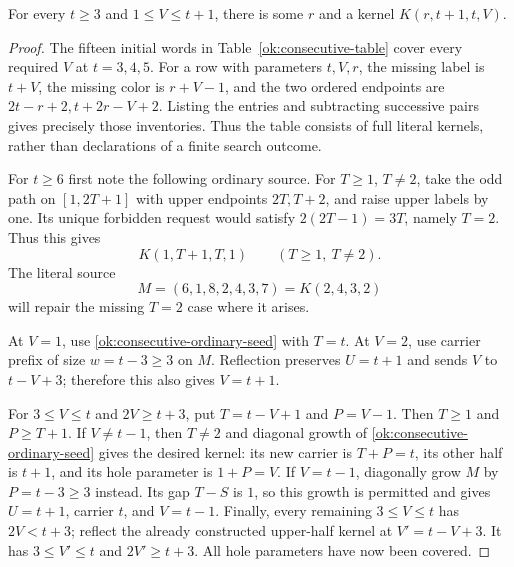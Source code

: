 \begin{lemma}\label{ok:consecutive-kernels}
For every $t\ge3$ and $1\le V\le t+1$, there is some $r$
and a kernel $K(r,t+1,t,V)$.
\end{lemma}
\begin{proof}
The fifteen initial words in Table~\ref{ok:consecutive-table}
cover every required $V$ at $t=3,4,5$.
For a row with parameters $t,V,r$, the missing label is $t+V$,
the missing color is $r+V-1$, and the two ordered endpoints are
$2t-r+2,t+2r-V+2$.
Listing the entries and subtracting successive pairs gives precisely
those inventories. Thus the table consists of full literal kernels,
rather than declarations of a finite search outcome.

For $t\ge6$ first note the following ordinary source. For
$T\ge1$, $T\ne2$, take the odd path on $[1,2T+1]$ with upper
endpoints $2T,T+2$, and raise upper labels by one.
Its unique forbidden request would satisfy $2(2T-1)=3T$,
namely $T=2$. Thus this gives
\begin{equation}
 K(1,T+1,T,1)\qquad(T\ge1,\ T\ne2).
 \label{ok:consecutive-ordinary-seed}
\end{equation}
The literal source
\[
 M=(6,1,8,2,4,3,7)=K(2,4,3,2)
 \]
will repair the missing $T=2$ case where it arises.

At $V=1$, use \eqref{ok:consecutive-ordinary-seed} with $T=t$.
At $V=2$, use carrier prefix of size $w=t-3\ge3$ on $M$.
Reflection preserves $U=t+1$ and sends $V$ to $t-V+3$;
therefore this also gives $V=t+1$.

For $3\le V\le t$ and $2V\ge t+3$, put
$T=t-V+1$ and $P=V-1$.
Then $T\ge1$ and $P\ge T+1$.
If $V\ne t-1$, then $T\ne2$ and diagonal growth of
\eqref{ok:consecutive-ordinary-seed} gives the desired kernel:
its new carrier is $T+P=t$, its other half is $t+1$,
and its hole parameter is $1+P=V$.
If $V=t-1$, diagonally grow $M$ by $P=t-3\ge3$ instead.
Its gap $T-S$ is $1$, so this growth is permitted and gives
$U=t+1$, carrier $t$, and $V=t-1$.
Finally, every remaining $3\le V\le t$ has $2V<t+3$;
reflect the already constructed upper-half kernel at
$V'=t-V+3$. It has $3\le V'\le t$ and $2V'\ge t+3$.
All hole parameters have now been covered.
\end{proof}

